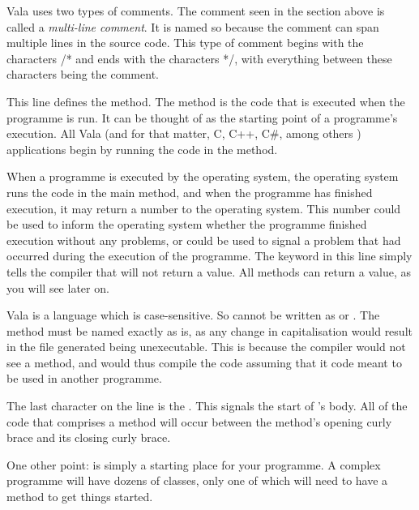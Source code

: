 Vala uses two types of comments. The comment seen in the section above is called a \emph{multi-line comment}. It is named so because the comment can span multiple lines in the source code. This type of comment begins with the characters /* and ends with the characters */, with everything between these characters being the comment.


This line defines the  method. The  method is the code that is executed when the programme is run. It can be thought of as the starting point of a programme's execution. All Vala (and for that matter, C, C++, C\#, among others ) applications begin by running the code in the  method.


When a programme is executed by the operating system, the operating system runs the code in the main method, and when the programme has finished execution, it may return a number to the operating system. This number could be used to inform the operating system whether the programme finished execution without any problems, or could be used to signal a problem that had occurred during the execution of the programme. The keyword  in this line simply tells the compiler that  will not return a value. All methods can return a value, as you will see later on.

Vala is a language which is case-sensitive. So  cannot be written as  or . The  method must be named exactly as is, as any change in capitalisation would result in the file generated being unexecutable. This is because the compiler would not see a  method, and would thus compile the code assuming that it code meant to be used in another programme.

The last character on the line is the \inlinecode{\{}. This signals the start of ’s body. All of the code that comprises a method will occur between the method’s opening curly brace and its closing curly brace.

One other point:  is simply a starting place for your programme. A complex programme will have dozens of classes, only one of which will need to have a  method to get things started.



